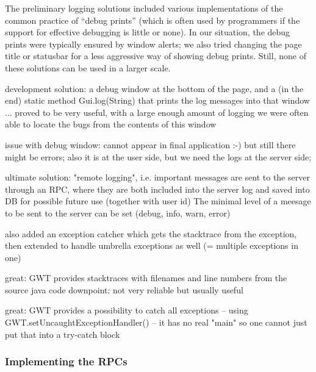 The preliminary logging solutions included various implementations of the common practice of ``debug prints'' (which is often used by programmers if the support for effective debugging is little or none). In our situation, the debug prints were typically ensured by window alerts; we also tried changing the page title or statusbar for a less aggressive way of showing debug prints. Still, none of these solutions can be used in a larger scale.

development solution: a debug window at the bottom of the page, and a (in the end) static method Gui.log(String) that prints the log messages into that window
... proved to be very useful, with a large enough amount of logging we were often able to locate the bugs from the contents of this window

issue with debug window: cannot appear in final application :-) but still there might be errors;
also it is at the user side, but we need the logs at the server side;

ultimate solution: "remote logging", i.e. important messages are sent to the server through an RPC, where they are both included into the server log and saved into DB for possible future use (together with user id)
The minimal level of a meesage to be sent to the server can be set (debug, info, warn, error)

also added an exception catcher which gets the stacktrace from the exception, then extended to handle umbrella exceptions as well (= multiple exceptions in one)

great: GWT provides stacktraces with filenames and line numbers from the source java code
downpoint: not very reliable but usually useful

great: GWT provides a possibility to catch all exceptions -- using GWT.setUncaughtExceptionHandler() -- it has no real "main" so one cannot just put that into a try-catch block

\subsubsection{Implementing the RPCs}

